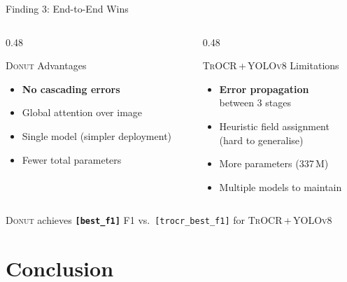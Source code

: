\documentclass[aspectratio=169,11pt]{beamer}
\newcommand{\VAR}[1]{\texttt{[#1]}\xspace}
\newcommand{\donut}{\textsc{Donut}\xspace}
\newcommand{\trocr}{\textsc{TrOCR}\xspace}
\newcommand{\yolo}{\textsc{YOLOv8}\xspace}
\newcommand{\hlnum}[1]{\textcolor{AccentTeal}{\textbf{#1}}}
\newcommand{\redbf}[1]{\textcolor{WarnRed}{\textbf{#1}}}
\newcommand{\greenbf}[1]{\textcolor{GoodGreen}{\textbf{#1}}}
\begin{document}
\begin{frame}{Finding 3: End-to-End Wins}
  \begin{columns}[T]
    \begin{column}{0.48\textwidth}
      \begin{exampleblock}{\donut Advantages}
        \begin{itemize}
          \item \greenbf{No cascading errors}
          \item Global attention over image
          \item Single model (simpler deployment)
          \item Fewer total parameters
        \end{itemize}
      \end{exampleblock}
    \end{column}
    \begin{column}{0.48\textwidth}
      \begin{alertblock}{\trocr\,+\,\yolo Limitations}
        \begin{itemize}
          \item \redbf{Error propagation}\\
                between 3 stages
          \item Heuristic field assignment\\
                (hard to generalise)
          \item More parameters (337\,M)
          \item Multiple models to maintain
        \end{itemize}
      \end{alertblock}
    \end{column}
  \end{columns}

  \vspace{0.4cm}
  \centering
  {\large\donut achieves \hlnum{\VAR{best_f1}} F1 vs.\
   \VAR{trocr_best_f1} for \trocr\,+\,\yolo}
\end{frame}

\section{Conclusion}
\end{document}
